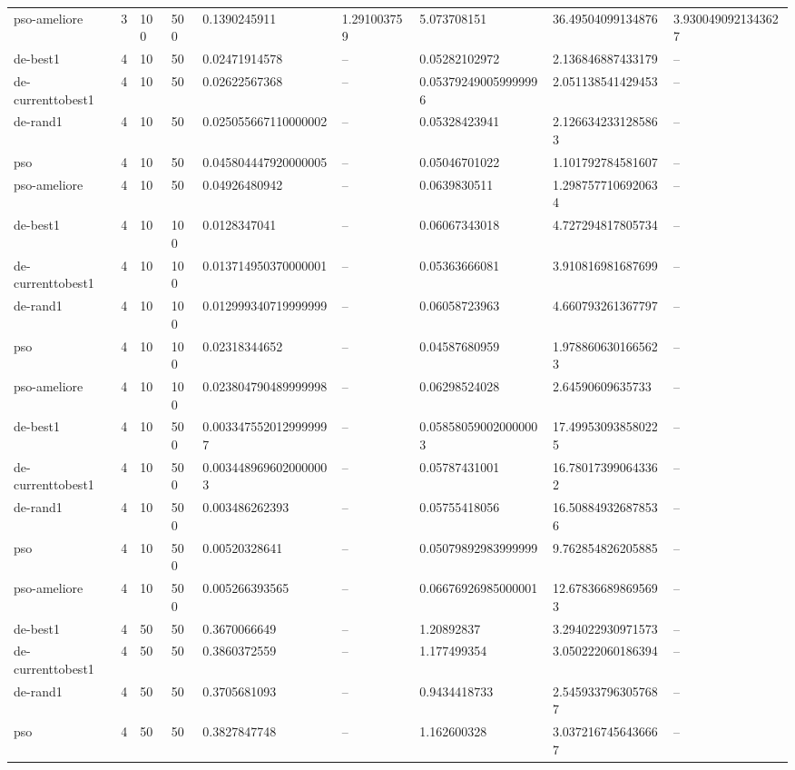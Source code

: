 \begin{table}[t]
\begin{tabular}{lllllllll}
pso-ameliore & 3 & 100 & 500 & 0.1390245911 & 1.291003759 & 5.073708151 & 36.49504099134876 & 3.9300490921343627 \\
de-best1 & 4 & 10 & 50 & 0.02471914578 & -- & 0.05282102972 & 2.136846887433179 & -- \\
de-currenttobest1 & 4 & 10 & 50 & 0.02622567368 & -- & 0.053792490059999996 & 2.051138541429453 & -- \\
de-rand1 & 4 & 10 & 50 & 0.025055667110000002 & -- & 0.05328423941 & 2.1266342331285863 & -- \\
pso & 4 & 10 & 50 & 0.045804447920000005 & -- & 0.05046701022 & 1.101792784581607 & -- \\
pso-ameliore & 4 & 10 & 50 & 0.04926480942 & -- & 0.0639830511 & 1.2987577106920634 & -- \\
de-best1 & 4 & 10 & 100 & 0.0128347041 & -- & 0.06067343018 & 4.727294817805734 & -- \\
de-currenttobest1 & 4 & 10 & 100 & 0.013714950370000001 & -- & 0.05363666081 & 3.910816981687699 & -- \\
de-rand1 & 4 & 10 & 100 & 0.012999340719999999 & -- & 0.06058723963 & 4.660793261367797 & -- \\
pso & 4 & 10 & 100 & 0.02318344652 & -- & 0.04587680959 & 1.9788606301665623 & -- \\
pso-ameliore & 4 & 10 & 100 & 0.023804790489999998 & -- & 0.06298524028 & 2.64590609635733 & -- \\
de-best1 & 4 & 10 & 500 & 0.0033475520129999997 & -- & 0.058580590020000003 & 17.499530938580225 & -- \\
de-currenttobest1 & 4 & 10 & 500 & 0.0034489696020000003 & -- & 0.05787431001 & 16.780173990643362 & -- \\
de-rand1 & 4 & 10 & 500 & 0.003486262393 & -- & 0.05755418056 & 16.508849326878536 & -- \\
pso & 4 & 10 & 500 & 0.00520328641 & -- & 0.05079892983999999 & 9.762854826205885 & -- \\
pso-ameliore & 4 & 10 & 500 & 0.005266393565 & -- & 0.06676926985000001 & 12.678366898695693 & -- \\
de-best1 & 4 & 50 & 50 & 0.3670066649 & -- & 1.20892837 & 3.294022930971573 & -- \\
de-currenttobest1 & 4 & 50 & 50 & 0.3860372559 & -- & 1.177499354 & 3.050222060186394 & -- \\
de-rand1 & 4 & 50 & 50 & 0.3705681093 & -- & 0.9434418733 & 2.5459337963057687 & -- \\
pso & 4 & 50 & 50 & 0.3827847748 & -- & 1.162600328 & 3.0372167456436667 & -- \\

\end{tabular}
\end{table}

